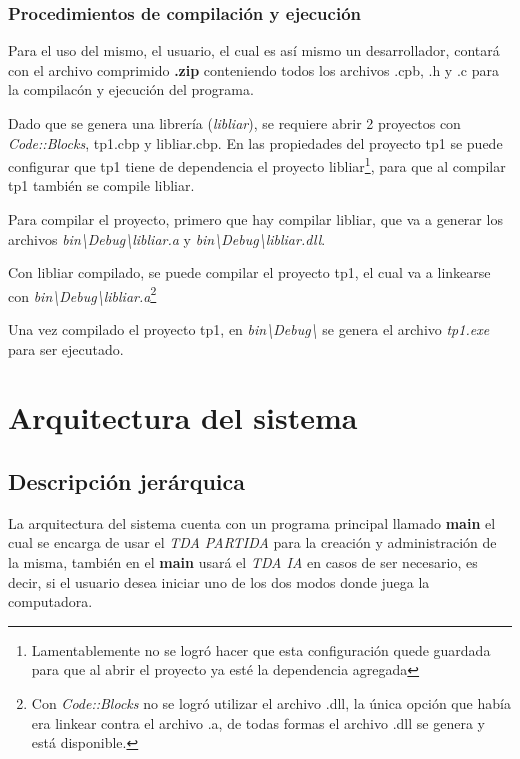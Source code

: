 \documentclass[12pt,a4paper]{article}
\begin{document}
\subsubsection{Procedimientos de compilaci\'on y ejecuci\'on}
    Para el uso del mismo, el usuario, el cual es as\'i mismo un desarrollador, contar\'a con el archivo comprimido {\bf .zip} conteniendo todos los archivos .cpb, .h y .c para la compilac\'on y ejecuci\'on del programa.
		
		Dado que se genera una librer\'ia (\emph{libliar}), se requiere abrir 2 proyectos con \emph{Code::Blocks}, tp1.cbp y libliar.cbp. En las propiedades del proyecto tp1 se puede configurar que tp1 tiene de dependencia el proyecto libliar\footnote{Lamentablemente no se logr\'o hacer que esta configuraci\'on quede guardada para que al abrir el proyecto ya est\'e la dependencia agregada}, para que al compilar tp1 tambi\'en se compile libliar.
		
		Para compilar el proyecto, primero que hay compilar libliar, que va a generar los archivos \emph{bin\textbackslash Debug\textbackslash libliar.a} y \emph{bin\textbackslash Debug\textbackslash libliar.dll}.
		
		Con libliar compilado, se puede compilar el proyecto tp1, el cual va a linkearse con \emph{bin\textbackslash Debug\textbackslash libliar.a}\footnote{Con \emph{Code::Blocks} no se logr\'o utilizar el archivo .dll, la \'unica opci\'on que hab\'ia era linkear contra el archivo .a, de todas formas el archivo .dll se genera y est\'a disponible.}
		
		Una vez compilado el proyecto tp1, en \emph{bin\textbackslash Debug\textbackslash} se genera el archivo \emph{tp1.exe} para ser ejecutado.

\section{Arquitectura del sistema}

\subsection{Descripci\'on jer\'arquica}
    La arquitectura del sistema cuenta con un programa principal llamado {\bf main} el cual se encarga de usar el {\itshape TDA PARTIDA} para la creaci\'on y administraci\'on de la misma, tambi\'en en el {\bf main} usar\'a el {\itshape TDA IA} en casos de ser necesario, es decir, si el usuario desea iniciar uno de los dos modos donde juega la computadora.
\end{document}
